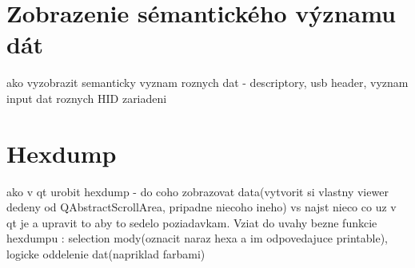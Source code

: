 \section{Zobrazenie sémantického významu dát}
ako vyzobrazit semanticky vyznam roznych dat - descriptory, usb header, vyznam input dat roznych HID zariadeni
\section{Hexdump}
ako v qt urobit hexdump - do coho zobrazovat data(vytvorit si vlastny viewer dedeny od QAbstractScrollArea, pripadne niecoho ineho) vs najst nieco co uz v qt je a upravit to aby to sedelo poziadavkam. Vziat do uvahy bezne funkcie hexdumpu : selection mody(oznacit naraz hexa a im odpovedajuce printable), logicke oddelenie dat(napriklad farbami)








